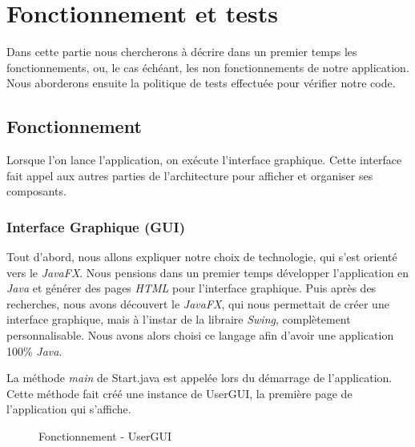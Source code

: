 \chapter{Fonctionnement et tests}

Dans cette partie nous chercherons à décrire dans un premier temps les fonctionnements, ou, le cas échéant, les non fonctionnements de notre application.  Nous aborderons ensuite la politique de tests effectuée pour vérifier notre code. 

\section{Fonctionnement}

Lorsque l'on lance l'application, on exécute l'interface graphique. Cette interface fait appel aux autres parties de l'architecture pour afficher et organiser ses composants.

\subsection{Interface Graphique (GUI)}\label{GUI}

Tout d'abord, nous allons expliquer notre choix de technologie, qui s'est orienté vers le \textit{JavaFX}.
Nous pensions dans un premier temps développer l'application en \textit{Java} et générer des pages \textit{HTML} pour l'interface graphique. Puis après des recherches, nous avons découvert le \textit{JavaFX}, qui nous permettait de créer une interface graphique, mais à l'instar de la libraire \textit{Swing}, complètement personnalisable. Nous avons alors choisi ce langage afin d'avoir une application 100\% \textit{Java}.


La méthode \textit{main} de Start.java est appelée lors du démarrage de l'application. Cette méthode fait créé une instance de UserGUI, la première page de l'application qui s'affiche.

\begin{figure}[!ht]
\begin{center}
  \caption{Fonctionnement - UserGUI}
  \label{UserGUI} 
\end{center}
\end{figure}

